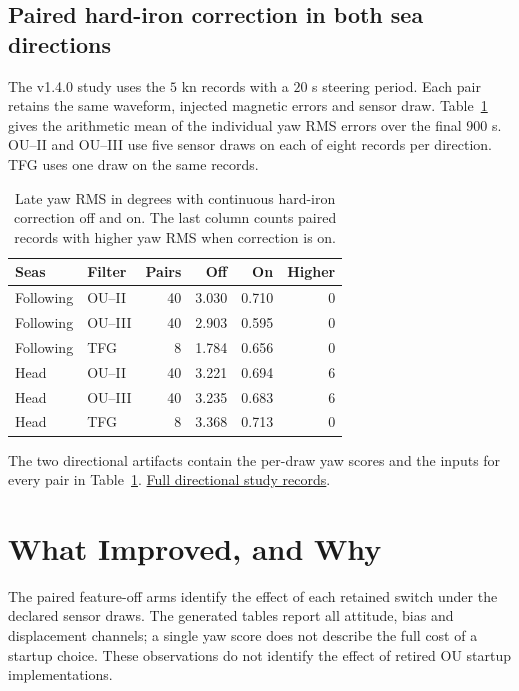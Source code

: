 \documentclass[conference]{IEEEtran}
\begin{document}
\subsection{Paired hard-iron correction in both sea directions}
The v1.4.0 study uses the $5$ kn records with a $20$ s steering period.
Each pair retains the same waveform, injected magnetic errors and sensor draw.
Table~\ref{tab:two-direction-hard-iron} gives the arithmetic mean of the individual
yaw RMS errors over the final $900$ s. OU--II and OU--III use five sensor draws
on each of eight records per direction. TFG uses one draw on the same records.
\begin{table}[t]\centering\footnotesize
\caption{Late yaw RMS in degrees with continuous hard-iron correction off and on. The last column counts paired records with higher yaw RMS when correction is on.}
\label{tab:two-direction-hard-iron}\setlength{\tabcolsep}{3.3pt}
\begin{tabular}{@{}llrrrr@{}}\toprule
Seas & Filter & Pairs & Off & On & Higher \\ \midrule
Following & OU--II & 40 & 3.030 & 0.710 & 0 \\
Following & OU--III & 40 & 2.903 & 0.595 & 0 \\
Following & TFG & 8 & 1.784 & 0.656 & 0 \\
Head & OU--II & 40 & 3.221 & 0.694 & 6 \\
Head & OU--III & 40 & 3.235 & 0.683 & 6 \\
Head & TFG & 8 & 3.368 & 0.713 & 0 \\
\bottomrule\end{tabular}\end{table}
The two directional artifacts contain the per-draw yaw scores and the inputs for every pair in Table~\ref{tab:two-direction-hard-iron}.
\href{https://github.com/bareboat-necessities/ocean-imu/actions/runs/44367501540}{Full directional study records}.


\section{What Improved, and Why}
\label{sec:what-improved}

The paired feature-off arms identify the effect of each retained switch
under the declared sensor draws. The generated tables report all attitude,
bias and displacement channels; a single yaw score does not describe the
full cost of a startup choice. These observations do not identify the effect
of retired OU startup implementations.
\end{document}
